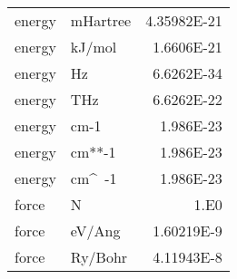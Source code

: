 \begin{center}
\begin{tabular}{llr}
energy   & mHartree   & 4.35982E-21 \\
energy   & kJ/mol     & 1.6606E-21 \\
energy   & Hz         & 6.6262E-34 \\
energy   & THz        & 6.6262E-22 \\
energy   & cm-1       & 1.986E-23 \\
energy   & cm**-1     & 1.986E-23 \\
energy   & cm\^~-1      & 1.986E-23 \\
force    & N          & 1.E0 \\
force    & eV/Ang     & 1.60219E-9 \\
force    & Ry/Bohr    & 4.11943E-8 \\
\hline
\end{tabular}


\end{center}
